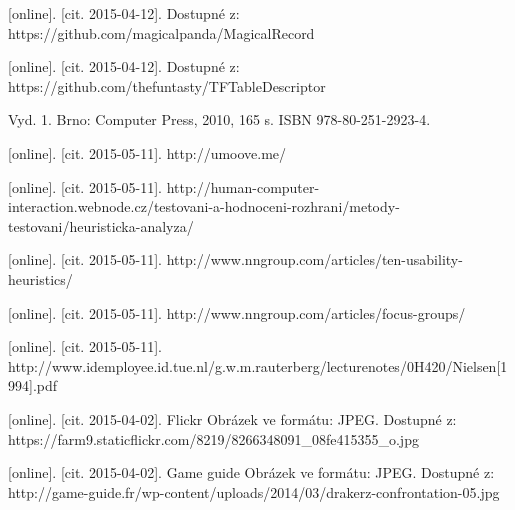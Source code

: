\documentclass[twoside,12pt]{article}
\begin{document}
\begin{literatura}
{
	[online]. [cit. 2015-04-12]. Dostupné z: https://github.com/magicalpanda/MagicalRecord
}

{
	[online]. [cit. 2015-04-12]. Dostupné z: https://github.com/thefuntasty/TFTableDescriptor
}

{
	Vyd. 1. Brno: Computer Press, 2010, 165 s. ISBN 978-80-251-2923-4.
}

{
	[online]. [cit. 2015-05-11]. http://umoove.me/
}

{
	[online]. [cit. 2015-05-11]. http://human-computer-interaction.webnode.cz/testovani-a-hodnoceni-rozhrani/metody-testovani/heuristicka-analyza/
}

{
	[online]. [cit. 2015-05-11]. http://www.nngroup.com/articles/ten-usability-heuristics/
}

{
	[online]. [cit. 2015-05-11]. http://www.nngroup.com/articles/focus-groups/
}

{
	[online]. [cit. 2015-05-11]. http://www.idemployee.id.tue.nl/g.w.m.rauterberg/lecturenotes/0H420/Nielsen[1994].pdf
}




{
	[online]. [cit. 2015-04-02]. Flickr
	Obrázek ve formátu: JPEG. Dostupné z: https://farm9.staticflickr.com/8219/8266348091\_08fe415355\_o.jpg
}

{
	[online]. [cit. 2015-04-02]. Game guide
	Obrázek ve formátu: JPEG. Dostupné z: http://game-guide.fr/wp-content/uploads/2014/03/drakerz-confrontation-05.jpg
}


\end{literatura}
\end{document}

